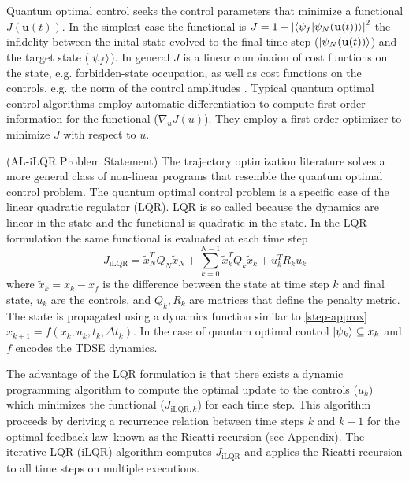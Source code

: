 \documentclass[
  amsfonts,
  amsmath,
  tbtags,
  amssymb,
  aps,
  nobibnotes,
  prl,
  twocolumn,
]{revtex4-2}
\begin{document}
Quantum optimal control seeks the control
parameters that minimize a functional $J(\textbf{u}(t))$.
In the simplest case the functional is
$J = 1 - {\lvert \braket{\psi_{f} \lvert \psi_{N}(\textbf{u}(t))} \rvert}^{2}$
the infidelity between the inital state evolved
to the final time step ($\ket{\psi_{N}(\textbf{u}(t))}$)
and the target state ($\ket{\psi_{f}}$). In general
$J$ is a linear combinaion of cost functions on the state, e.g.
forbidden-state occupation, as well as
cost functions on the controls, e.g. the norm of the control amplitudes
\cite{leung2017speedup}. Typical quantum optimal control
algorithms employ automatic differentiation
to compute first order information for the functional ($\nabla_{u} J(u)$).
They employ a first-order optimizer to minimize $J$ with respect to $u$.

(AL-iLQR Problem Statement) The trajectory optimization
literature solves a more general class of non-linear programs that resemble
the quantum optimal control problem. The quantum optimal control
problem is a specific case of the linear quadratic regulator (LQR).
LQR is so called because the dynamics are linear in the state and
the functional is quadratic in the state. In the LQR formulation
the same functional is evaluated at each time step
\begin{equation}
  J_{\textrm{iLQR}} = \tilde{x}_{N}^{T} Q_{N} \tilde{x}_{N}
  + \sum_{k = 0}^{N - 1} \tilde{x}_{k}^{T} Q_{k} \tilde{x}_{k} + u_{k}^{T} R_{k} u_{k}
\end{equation}
where $\tilde{x}_{k} = x_{k} - x_{f}$ is the difference between the state
at time step $k$ and final state, $u_{k}$ are the controls,
and $Q_{k}, R_{k}$ are matrices that define the penalty metric.
The state is propagated using a dynamics function similar to \ref{step-approx}
$x_{k + 1} = f(x_{k}, u_{k}, t_{k}, \Delta t_{k})$.
In the case of quantum optimal control $\ket{\psi_{k}} \subseteq x_{k}$
and $f$ encodes the TDSE dynamics.

The advantage of the LQR formulation
is that there exists a dynamic programming algorithm to compute the
optimal update to the controls ($u_{k}$) which minimizes the functional
($J_{\textrm{iLQR}, k}$) for each time step. This algorithm proceeds by deriving a
recurrence relation between time steps $k$ and $k + 1$ for the optimal
feedback law--known as the Ricatti recursion (see Appendix). The
iterative LQR (iLQR) algorithm computes $J_{\textrm{iLQR}}$
and applies the Ricatti recursion to all time steps on multiple
executions.
\end{document}
